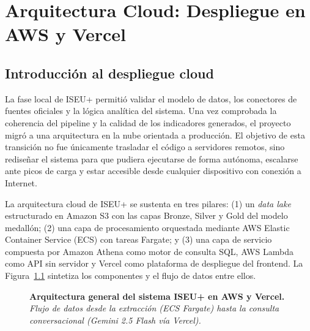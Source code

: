 \chapter{Arquitectura Cloud: Despliegue en AWS y Vercel}
\label{ch:cloud}

\section{Introducción al despliegue cloud}

La fase local de ISEU+ permitió validar el modelo de datos, los conectores de fuentes oficiales y la lógica analítica del sistema. Una vez comprobada la coherencia del pipeline y la calidad de los indicadores generados, el proyecto migró a una arquitectura en la nube orientada a producción. El objetivo de esta transición no fue únicamente trasladar el código a servidores remotos, sino rediseñar el sistema para que pudiera ejecutarse de forma autónoma, escalarse ante picos de carga y estar accesible desde cualquier dispositivo con conexión a Internet.

La arquitectura cloud de ISEU+ se sustenta en tres pilares: (1) un \textit{data lake} estructurado en Amazon S3 con las capas Bronze, Silver y Gold del modelo medallón; (2) una capa de procesamiento orquestada mediante AWS Elastic Container Service (ECS) con tareas Fargate; y (3) una capa de servicio compuesta por Amazon Athena como motor de consulta SQL, AWS Lambda como API sin servidor y Vercel como plataforma de despliegue del frontend. La Figura~\ref{fig:arquitectura_cloud} sintetiza los componentes y el flujo de datos entre ellos.

\begin{figure}[h!]
\centering
{}
\caption{\textbf{Arquitectura general del sistema ISEU+ en AWS y Vercel.}\\
\textit{Flujo de datos desde la extracción (ECS Fargate) hasta la consulta conversacional (Gemini 2.5 Flash vía Vercel).}}
\label{fig:arquitectura_cloud}
\end{figure}

